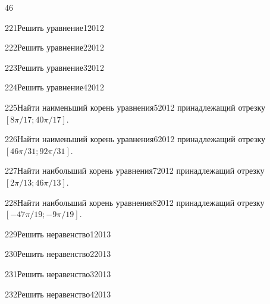 \begin{TrigSourcePage}{46}
\begin{TrigExercise}{221}{Решить уравнение}{1}{2012}
\end{TrigExercise}
\begin{TrigExercise}{222}{Решить уравнение}{2}{2012}
\end{TrigExercise}
\begin{TrigExercise}{223}{Решить уравнение}{3}{2012}
\end{TrigExercise}
\begin{TrigExercise}{224}{Решить уравнение}{4}{2012}
\end{TrigExercise}
\begin{TrigExercise}{225}{Найти наименьший корень уравнения}{5}{2012}
принадлежащий отрезку $[8\pi/17;40\pi/17]$.
\end{TrigExercise}
\begin{TrigExercise}{226}{Найти наименьший корень уравнения}{6}{2012}
принадлежащий отрезку $[46\pi/31;92\pi/31]$.
\end{TrigExercise}
\begin{TrigExercise}{227}{Найти наибольший корень уравнения}{7}{2012}
принадлежащий отрезку $[2\pi/13;46\pi/13]$.
\end{TrigExercise}
\begin{TrigExercise}{228}{Найти наибольший корень уравнения}{8}{2012}
принадлежащий отрезку $[-47\pi/19;-9\pi/19]$.
\end{TrigExercise}
\begin{TrigExercise}{229}{Решить неравенство}{1}{2013}
\end{TrigExercise}
\begin{TrigExercise}{230}{Решить неравенство}{2}{2013}
\end{TrigExercise}
\begin{TrigExercise}{231}{Решить неравенство}{3}{2013}
\end{TrigExercise}
\begin{TrigExercise}{232}{Решить неравенство}{4}{2013}
\end{TrigExercise}
\end{TrigSourcePage}

